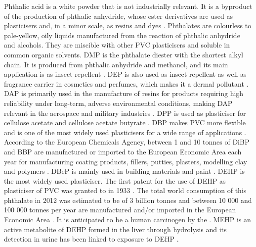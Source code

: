 Phthalic acid is a white powder that is not industrially relevant.
%
It is a byproduct of the production of phthalic anhydride, whose ester derivatives are used as plasticisers and, in a minor scale, as resins and dyes
\cite{lorz2000phthalic}.
%
Phthalates are colourless to pale-yellow, oily liquids manufactured from the reaction of phthalic anhydride and alcohols. They are miscible with other PVC plasticisers and soluble in common organic solvents. 
%
DMP is the phthalate diester with the shortest alkyl chain. It is produced from phthalic anhydride and methanol, and  its main application is as insect repellent  \cite{lowenheim1975industrial,o2013merck,brown1997insect}.
%
DEP is also used as insect repellent as well as fragrance carrier in cosmetics and perfumes, which makes it a dermal pollutant  \cite{api2001toxicological}.
%
DAP is primarily used in the manufacture of resins for products requiring high reliability under long-term, adverse environmental conditions, making DAP relevant in the aerospace and military industries
\cite{shenoy2007modification}.
%
%
DPP is used as plasticiser for cellulose acetate and cellulose acetate butyrate \cite{fordyce1940plasticizers}.
%
DBP makes PVC more flexible and is one of the most widely used plasticisers for a wide range of applications
\cite{lorz2000phthalic,taylor2001toxicological}.
%
According to the European Chemicals Agency, between 1 and 10 tonnes of DiBP and BBP  are manufactured or imported to the European Economic Area each year for manufacturing
coating products, fillers, putties, plasters, modelling clay and polymers 
\cite{echaDiBP,echaBBP}. 
%
DBeP is mainly used in building materials and paint \cite{epaDBeP}.
%
DEHP is the most widely used plasticiser. 
%
The first patent for the use of DEHP as plasticiser of PVC was granted to \citeauthor{kyrides1933octyl} in 1933 \cite{kyrides1933octyl}.
%
The total world consumption of this phthalate in 2012 was estimated to be of 3 billion tonnes and  between 10 000 and 100 000 tonnes per year are manufactured and/or imported in the European Economic Area \cite{doi:10.1002/14356007.a20_181.pub2,echaDEHP}.
%
It is anticipated to be a human carcinogen by the \citeauthor{us201614th} \cite{us201614th}.
%
MEHP is an active metabolite of DEHP formed in the liver through hydrolysis and its detection in urine has been linked to exposure to DEHP \cite{wittassek2008phthalates,becker2004dehp}. 






